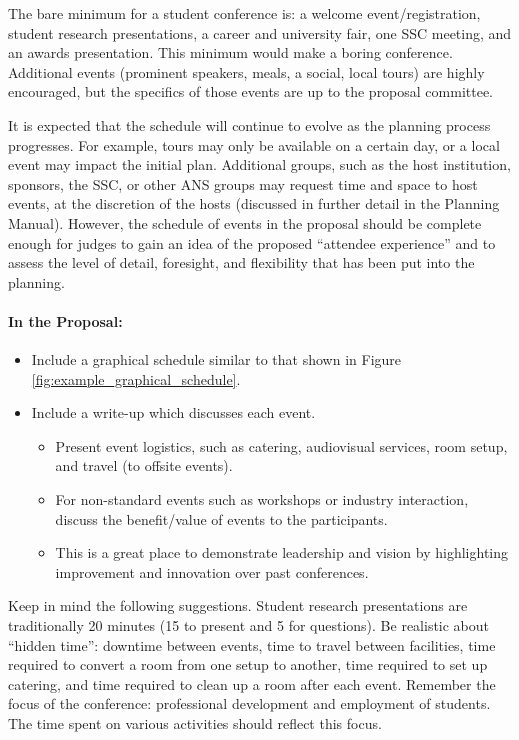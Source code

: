 \documentclass[12pt]{article}
\begin{document}
The bare minimum for a student conference is: a welcome event/registration, student
research presentations, a career and university fair, one SSC meeting, and an awards
presentation. This minimum would make a boring conference. 
Additional events (prominent speakers, meals, a social, local tours) are highly encouraged, but the specifics of
those events are up to the proposal committee.

It is expected that the schedule will continue to evolve as the planning process progresses. 
For example, tours may only be available on a certain day, or a local event may
impact the initial plan. 
Additional groups, such as the host institution, sponsors, the SSC, or other ANS groups may request time and space to host events, at the discretion of the hosts (discussed in further detail in the Planning Manual).
However, the schedule of events in the proposal should be
complete enough for judges to gain an idea of the proposed ``attendee experience” and
to assess the level of detail, foresight, and flexibility that has been put into the planning.

\paragraph{In the Proposal:}
\begin{itemize}
\item{Include a graphical schedule similar to that shown in Figure \ref{fig:example_graphical_schedule}.}

\item{Include a write-up which discusses each event.
\begin{itemize}
\item{Present event logistics, such as catering, audiovisual services, room setup, and travel (to offsite events).}

\item{For non-standard events such as workshops or industry interaction, discuss the
benefit/value of events to the participants.}
\item{This is a great place to demonstrate leadership and vision by highlighting
improvement and innovation over past conferences.}
\end{itemize}
}
\end{itemize}

Keep in mind the following suggestions. Student research presentations are traditionally 20 minutes (15 to present and 5
for questions).
Be realistic about ``hidden time”: downtime between events, time to travel
between facilities, time required to convert a room from one setup to another, time
required to set up catering, and time required to clean up a room after each event.
Remember the focus of the conference: professional development and employment of students. 
The time spent on various activities should reflect this focus.
\end{document}
